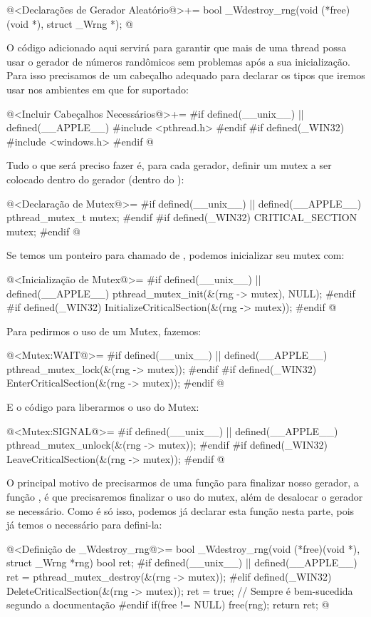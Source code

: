 \iniciocodigo
@<Declarações de Gerador Aleatório@>+=
bool _Wdestroy_rng(void (*free)(void *), struct _Wrng *);
@
\fimcodigo


O código adicionado aqui servirá para garantir que mais de uma thread
possa usar o gerador de números randômicos sem problemas após a sua
inicialização. Para isso precisamos de um cabeçalho adequado para
declarar os tipos que iremos usar nos ambientes em que for suportado:

\iniciocodigo
@<Incluir Cabeçalhos Necessários@>+=
#if defined(__unix__) || defined(__APPLE__)
#include <pthread.h>
#endif
#if defined(_WIN32)
#include <windows.h>
#endif
@
\fimcodigo

Tudo o que será preciso fazer é, para cada gerador, definir um mutex a
ser colocado dentro do gerador (dentro do ):

\iniciocodigo
@<Declaração de Mutex@>=
#if defined(__unix__) || defined(__APPLE__)
pthread_mutex_t mutex;
#endif
#if defined(_WIN32)
CRITICAL_SECTION mutex;
#endif
@
\fimcodigo

Se temos um ponteiro para  chamado
de , podemos inicializar seu mutex com:

\iniciocodigo
@<Inicialização de Mutex@>=
#if defined(__unix__) || defined(__APPLE__)
pthread_mutex_init(&(rng -> mutex), NULL);
#endif
#if defined(_WIN32)
InitializeCriticalSection(&(rng -> mutex));
#endif
@
\fimcodigo

Para pedirmos o uso de um Mutex, fazemos:

\iniciocodigo
@<Mutex:WAIT@>=
#if defined(__unix__) || defined(__APPLE__)
pthread_mutex_lock(&(rng -> mutex));
#endif
#if defined(_WIN32)
EnterCriticalSection(&(rng -> mutex));
#endif
@
\fimcodigo

E o código para liberarmos o uso do Mutex:

\iniciocodigo
@<Mutex:SIGNAL@>=
#if defined(__unix__) || defined(__APPLE__)
pthread_mutex_unlock(&(rng -> mutex));
#endif
#if defined(_WIN32)
LeaveCriticalSection(&(rng -> mutex));
#endif
@
\fimcodigo

O principal motivo de precisarmos de uma função para finalizar nosso
gerador, a função , é que precisaremos
finalizar o uso do mutex, além de desalocar o gerador se
necessário. Como é só isso, podemos já declarar esta função nesta
parte, pois já temos o necessário para defini-la:

\iniciocodigo
@<Definição de \_Wdestroy\_rng@>=
bool _Wdestroy_rng(void (*free)(void *), struct _Wrng *rng){
  bool ret;
#if defined(__unix__) || defined(__APPLE__)
  ret = pthread_mutex_destroy(&(rng -> mutex));
#elif defined(_WIN32)
  DeleteCriticalSection(&(rng -> mutex));
  ret = true; // Sempre é bem-sucedida segundo a documentação
#endif
  if(free != NULL)
    free(rng);
  return ret;
}
@
\fimcodigo

